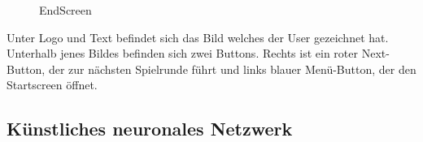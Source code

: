 \documentclass[11pt]{article}
\begin{document}
\begin{figure}
\centering
\caption{EndScreen}
\end{figure}

Unter Logo und Text befindet sich das Bild welches der User gezeichnet hat. Unterhalb jenes Bildes befinden sich zwei Buttons. Rechts ist ein roter Next-Button, der zur nächsten Spielrunde führt und links blauer Menü-Button, der den Startscreen öffnet.



\subsection{Künstliches neuronales Netzwerk}
\end{document}
